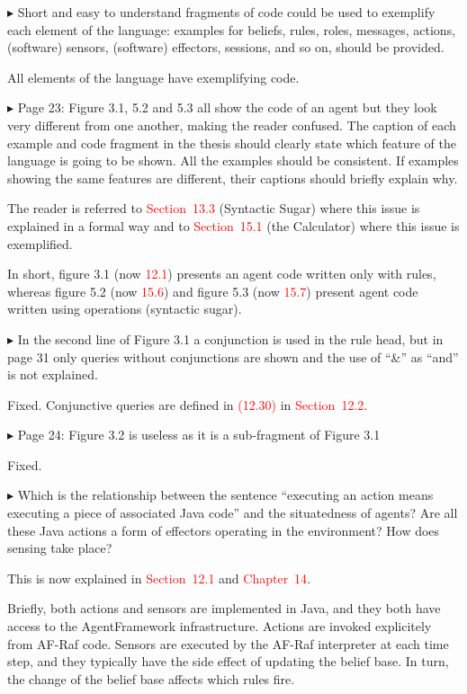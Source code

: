 \documentclass{article}
\newcommand*\R[1]{\textcolor{red}{#1}} %
\newenvironment{them}%
  {\bigskip\noindent\begingroup\color{blue}$\blacktriangleright$\enspace}%
  {\endgroup\par}
\begin{document}
\begin{them}
Short and easy to understand fragments of code could be used to exemplify each
element of the language: examples for beliefs, rules, roles, messages, actions,
(software) sensors, (software) effectors, sessions, and so on, should be
provided.
\end{them}
All elements of the language have exemplifying code. 

\begin{them}
Page 23:
Figure 3.1, 5.2 and 5.3 all show the code of an agent but they look very
different from one another, making the reader confused. The caption of each
example and code fragment in the thesis should clearly state which feature of
the language is going to be shown. All the examples should be consistent. If
examples showing the same features are different, their captions should briefly
explain why.
\end{them}
The reader is referred to \R{Section~13.3} (Syntactic Sugar) where this issue
is explained in a formal way and to \R{Section~15.1} (the Calculator) where
this issue is exemplified.

In short, figure 3.1 (now \R{12.1}) presents an agent code written only with
rules, whereas figure 5.2 (now \R{15.6}) and figure 5.3 (now \R{15.7}) present
agent code written using operations (syntactic sugar).

\begin{them}
In the second line of Figure 3.1 a conjunction is used in the rule head, but in
page 31 only queries without conjunctions are shown and the use of ``\&'' as
``and'' is not explained.
\end{them}
Fixed.
Conjunctive queries are defined in \R{(12.30)} in \R{Section~12.2}.


\begin{them}
Page 24:
Figure 3.2 is useless as it is a sub-fragment of Figure 3.1
\end{them}
Fixed. 

\begin{them}
Which is the relationship between the sentence ``executing an action means
executing a piece of associated Java code'' and the situatedness of agents? Are
all these Java actions a form of effectors operating in the environment? How
does sensing take place?
\end{them}

This is now explained in \R{Section~12.1} and \R{Chapter~14}.

Briefly, both actions and sensors are implemented in Java,
  and they both have access to the AgentFramework infrastructure.
Actions are invoked explicitely from AF-Raf code.
Sensors are executed by the AF-Raf interpreter at each time step,
  and they typically have the side effect of updating the belief base.
In turn, the change of the belief base affects
  which rules fire.
\end{document}
